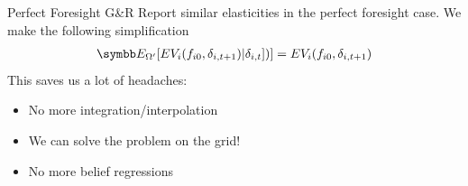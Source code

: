 \documentclass[aspectratio=169,11pt]{beamer}
\begin{document}
\begin{frame}{Perfect Foresight}
G\&R Report similar elasticities in the perfect foresight case. We make the following simplification
\begin{eqnarray*}
\E_{\Omega'}[ EV_i (f_{i0}, \delta_{i,t+1}) |\delta_{i,t}] )] = EV_i (f_{i0}, \delta_{i,t+1})
\end{eqnarray*}
This saves us a lot of headaches:
\begin{itemize}
\item No more integration/interpolation
\item We can solve the problem on the grid!
\item No more belief regressions
\end{itemize}
\end{frame}
%
%
%
\end{document}
